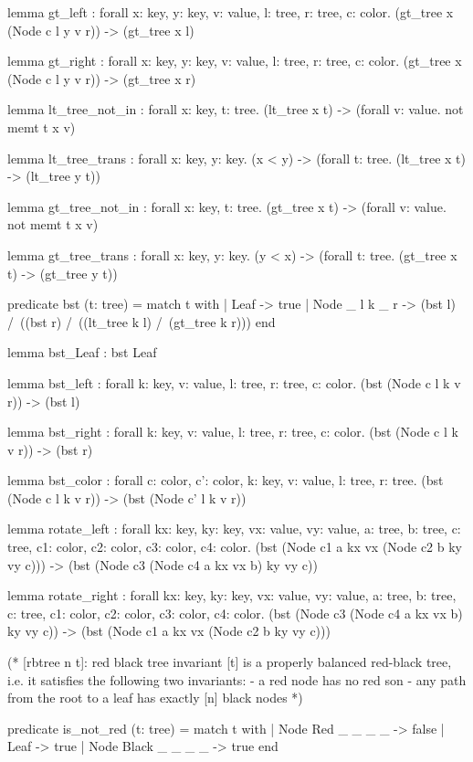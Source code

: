 \begin{whylang}
  lemma gt_left : 
  forall x: key, y: key, v: value, l: tree, r: tree, c: color. 
  (gt_tree x (Node c l y v r)) -> (gt_tree x l)

  lemma gt_right : 
  forall x: key, y: key, v: value, l: tree, r: tree, c: color. 
  (gt_tree x (Node c l y v r)) -> (gt_tree x r)

  lemma lt_tree_not_in : 
  forall x: key, t: tree. 
  (lt_tree x t) -> (forall v: value. not memt t x v)

  lemma lt_tree_trans : 
  forall x: key, y: key. 
  (x < y) -> (forall t: tree. (lt_tree x t) -> (lt_tree y t))

  lemma gt_tree_not_in : 
  forall x: key, t: tree. 
  (gt_tree x t) -> (forall v: value. not memt t x v)

  lemma gt_tree_trans : 
  forall x: key, y: key. 
  (y < x) -> (forall t: tree. (gt_tree x t) -> (gt_tree y t))

  predicate bst (t: tree) =
 match t with
 | Leaf -> true
 | Node _ l k _ r -> (bst l) /\ ((bst r) /\ ((lt_tree k l) /\ (gt_tree k r)))
  end

  lemma bst_Leaf : bst Leaf

  lemma bst_left : 
  forall k: key, v: value, l: tree, r: tree, c: color. 
  (bst (Node c l k v r)) -> (bst l)

  lemma bst_right : 
  forall k: key, v: value, l: tree, r: tree, c: color. 
  (bst (Node c l k v r)) -> (bst r)

  lemma bst_color : 
  forall c: color, c': color, k: key, v: value, l: tree, r: tree. 
  (bst (Node c l k v r)) -> (bst (Node c' l k v r))

  lemma rotate_left : 
  forall kx: key, ky: key, vx: value, vy: value, a: tree, b: tree, c: tree, 
  c1: color, c2: color, c3: color, c4: color. 
  (bst (Node c1 a kx vx (Node c2 b ky vy c))) -> 
  (bst (Node c3 (Node c4 a kx vx b) ky vy c))

  lemma rotate_right : 
  forall kx: key, ky: key, vx: value, vy: value, a: tree, b: tree, c: tree, 
  c1: color, c2: color, c3: color, c4: color. 
  (bst (Node c3 (Node c4 a kx vx b) ky vy c)) -> 
  (bst (Node c1 a kx vx (Node c2 b ky vy c)))

  (* [rbtree n t]: red black tree invariant
     [t] is a properly balanced red-black tree, i.e. it
      satisfies the following two invariants:
      - a red node has no red son
      - any path from the root to a leaf has exactly [n] black nodes
   *)

  predicate is_not_red (t: tree) =
 match t with
 | Node Red _ _ _ _ -> false
 | Leaf -> true
 | Node Black _ _ _ _ -> true
  end


\end{whylang}
